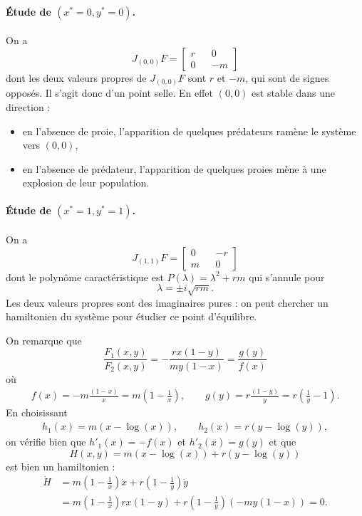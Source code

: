 \paragraph*{\'Etude de $(x^* = 0, y^* = 0)$.}
On a 
$$
J_{(0, 0)}F = 
  \left[\begin{array}{ccc} 
    r  & & 0 \\
    0 & & -m 
  \end{array}\right]
$$
dont les deux valeurs propres de $J_{(0, 0)}F$ sont $r$ et $-m$, qui sont de signes opposés. Il s'agit donc d'un point selle. En effet $(0, 0)$ est stable dans une direction : 
\begin{itemize}
  \item en l'absence de proie, l'apparition de quelques prédateurs ramène le système vers $(0, 0)$, 
  \item en l'absence de prédateur, l'apparition de quelques proies mène à une explosion de leur population.
\end{itemize}
  
\paragraph*{\'Etude de $(x^* = 1, y^* = 1)$.}
On a 
$$
J_{(1, 1)}F = 
  \left[\begin{array}{ccc} 
    0 & & -r  \\
    m  & & 0
  \end{array}\right]
$$
dont le polynôme caractéristique est $P(\lambda) = \lambda^2 + rm$ qui s'annule pour
$$
\lambda = \pm i \sqrt{rm}.
$$
Les deux valeurs propres sont des imaginaires pures : on peut chercher un hamiltonien du système pour étudier ce point d'équilibre.

\bigskip
On remarque que 
$$
\frac{F_1(x, y)}{F_2(x, y)} = -\frac{rx(1-y)}{my(1-x)} = \frac{g(y)}{f(x)}
$$
où
\begin{align*}
f(x) = -m \frac{(1-x)}{x} = m \left(1 - \frac1x\right), \qquad
g(y) = r \frac{(1-y)}{y} = r \left(\frac1y - 1\right).
\end{align*}
En choisissant 
\begin{align*}
  h_1(x) = m(x-\log(x)), \qquad h_2(x) = r(y-\log(y)),
\end{align*}
on vérifie bien que $h'_1(x) = -f(x)$ et $h'_2(x) = g(y)$ et que 
$$
H(x, y) = m(x-\log(x)) + r(y-\log(y))
$$
est bien un hamiltonien : 
\begin{align*}
\dot H 
& = m\left(1 - \frac1x\right) \dot x + r \left(1 - \frac1y\right) \dot y \\
& = m\left(1 - \frac1x\right) r x (1 - y) + r \left(1 - \frac1y\right) (- m y (1 - x)) 
= 0.
\end{align*}


